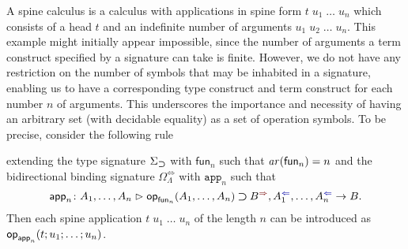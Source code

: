 A spine calculus is a calculus with applications in spine form $t\;u_1\;\ldots\;u_n$ which consists of a head $t$ and an indefinite number of arguments $u_1\;u_2\;\dots\;u_n$.
This example might initially appear impossible, since the number of arguments a term construct specified by a signature can take  is finite.
However, we do not have any restriction on the number of symbols that may be inhabited in a signature, enabling us to have a corresponding type construct and term construct for each number $n$ of arguments.
This underscores the importance and necessity of having an arbitrary set (with decidable equality) as a set of operation symbols.
To be precise, consider the following rule
\bgroup
\small
  \begin{mathpar}
  \end{mathpar}
\egroup
extending the type signature $\Sigma_{\bto}$ with $\mathsf{fun}_n$ such that $\arity({\mathsf{fun}_n}) = n$ and the bidirectional binding signature $\Omega_{\Lambda}^{\Leftrightarrow}$ with $\mathtt{app}_n$ such that 
\[
  \aritysymbol{\mathsf{app}_n}{A_1,\ldots, A_n}{\tyOp_{\mathsf{fun}_n}(A_1, \ldots, A_n) \bto B^{\syn}, A_1^{\chk}, \ldots, A_n^{\chk}}{B}.
\]
Then each spine application $t\;u_1\;\ldots\;u_n$ of the length $n$ can be introduced as $\tmOp_{\mathsf{app}_n}(t; u_1; \ldots; u_n)$.
